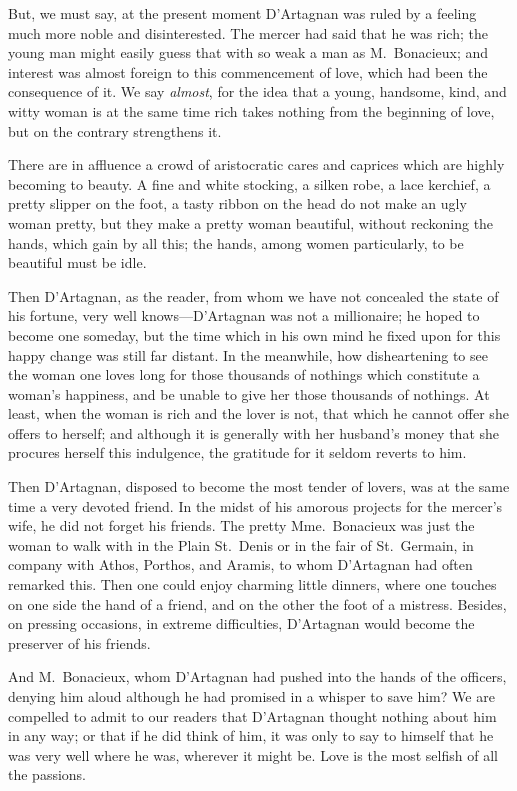 But, we must say, at the present moment D'Artagnan was ruled by a feeling much more noble and disinterested. The mercer had said that he was rich; the young man might easily guess that with so weak a man as M.~Bonacieux; and interest was almost foreign to this commencement of love, which had been the consequence of it. We say \emph{almost}, for the idea that a young, handsome, kind, and witty woman is at the same time rich takes nothing from the beginning of love, but on the contrary strengthens it. 

There are in affluence a crowd of aristocratic cares and caprices which are highly becoming to beauty. A fine and white stocking, a silken robe, a lace kerchief, a pretty slipper on the foot, a tasty ribbon on the head do not make an ugly woman pretty, but they make a pretty woman beautiful, without reckoning the hands, which gain by all this; the hands, among women particularly, to be beautiful must be idle. 

Then D'Artagnan, as the reader, from whom we have not concealed the state of his fortune, very well knows—D'Artagnan was not a millionaire; he hoped to become one someday, but the time which in his own mind he fixed upon for this happy change was still far distant. In the meanwhile, how disheartening to see the woman one loves long for those thousands of nothings which constitute a woman's happiness, and be unable to give her those thousands of nothings. At least, when the woman is rich and the lover is not, that which he cannot offer she offers to herself; and although it is generally with her husband's money that she procures herself this indulgence, the gratitude for it seldom reverts to him. 

Then D'Artagnan, disposed to become the most tender of lovers, was at the same time a very devoted friend. In the midst of his amorous projects for the mercer's wife, he did not forget his friends. The pretty Mme.~Bonacieux was just the woman to walk with in the Plain St.~Denis or in the fair of St.~Germain, in company with Athos, Porthos, and Aramis, to whom D'Artagnan had often remarked this. Then one could enjoy charming little dinners, where one touches on one side the hand of a friend, and on the other the foot of a mistress. Besides, on pressing occasions, in extreme difficulties, D'Artagnan would become the preserver of his friends. 

And M.~Bonacieux, whom D'Artagnan had pushed into the hands of the officers, denying him aloud although he had promised in a whisper to save him? We are compelled to admit to our readers that D'Artagnan thought nothing about him in any way; or that if he did think of him, it was only to say to himself that he was very well where he was, wherever it might be. Love is the most selfish of all the passions. 

